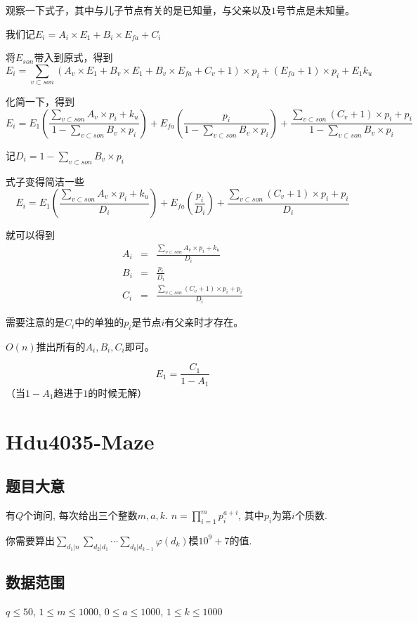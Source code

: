 \documentclass{ctexart}
\numberwithin{equation}{section}
\begin{document}
\begin{flushleft}
  观察一下式子，其中与儿子节点有关的是已知量，与父亲以及$1$号节点是未知量。

  我们记$E_i=A_i\times E_1+B_i\times E_{fa}+C_i$

  将$E_{son}$带入到原式，得到$$E_i=\sum_{v\subset son}(A_v\times E_1+B_v\times E_1+B_v\times E_{fa}+C_v+1)\times p_i+(E_{fa}+1)\times p_i+E_1k_u$$
  
  化简一下，得到$$E_i=E_1\left (\frac{\sum\limits_{v\subset son}A_v\times p_i+k_u}{1-\sum\limits_{v\subset son}B_v\times p_i}\right )+E_{fa} \left(\frac{p_i}{1-\sum\limits_{v\subset son}B_v\times p_i}\right)+\frac{\sum\limits_{v\subset son}(C_{v}+1)\times p_i +p_i}{1-\sum\limits_{v\subset son}B_v\times p_i}$$

  记$D_i=1-\sum\limits_{v\subset son}B_v\times p_i$

  式子变得简洁一些$$E_i=E_1\left (\frac{\sum\limits_{v\subset son}A_v\times p_i+k_u}{D_i}\right )+E_{fa} \left(\frac{p_i}{D_i}\right)+\frac{\sum\limits_{v\subset son}(C_{v}+1)\times p_i +p_i}{D_i}$$

  就可以得到
  \begin{eqnarray*} 
    A_i&=&\frac{\sum\limits_{v\subset son}A_v\times p_i+k_u}{D_i}\\
    B_i&=&\frac{p_i}{D_i}\\
    C_i&=&\frac{\sum\limits_{v\subset son}(C_{v}+1)\times p_i +p_i}{D_i}
  \end{eqnarray*}

  需要注意的是$C_i$中的单独的$p_i$是节点$i$有父亲时才存在。

  $O(n)$推出所有的$A_i,B_i,C_i$即可。

  $$E_1=\frac{C_1}{1-A_1}$$（当$1-A_1$趋进于$1$的时候无解）
  \newpage

  \section{Hdu4035-Maze}
  \subsection{题目大意}
  有$Q$个询问, 每次给出三个整数$m, a, k$. $\displaystyle{n = \prod_{i=1}^{m}p_{i}^{a+i}}$, 其中$p_i$为第$i$个质数.

  你需要算出$\displaystyle{\sum_{d_1 | n} \sum_{d_2|d_1} \cdots \sum_{d_k|d_{k-1}} \varphi(d_k)}$模$10^9 + 7$的值.
    

  \subsection{数据范围}
  $q \leq 50$, $1 \leq m \leq 1000$, $0 \leq a \leq 1000$, $1 \leq k \leq 1000$

\end{flushleft}
\end{document}
